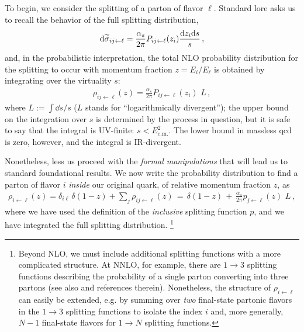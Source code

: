 To begin, we consider the splitting of a parton of flavor \(\ell\).
%
Standard lore asks us to recall the behavior of the full splitting distribution,
\begin{align}
    \dd\overset{\sim}{\sigma}_{ij \leftarrow \ell}
    =
    \frac{\alpha_s}{2\pi}
    P_{ij \leftarrow \ell}(z_i) \frac{\dd z_i \dd s}{s}
    \,,
\end{align}
and, in the probabilistic interpretation, the total NLO probability distribution for the splitting to occur with momentum fraction \(z = E_i/E_\ell\) is obtained by integrating over the virtuality \(s\):
\begin{align}
    \rho_{ij \leftarrow \ell}(z)
    =
    \frac{\alpha_s}{2\pi}
    P_{ij \leftarrow \ell}(z_i)
    \,\,
    L
    \,,
\end{align}
where \(L := \int \dd s / s\) (\(L\) stands for ``logarithmically divergent'');
%
the upper bound on the integration over \(s\) is determined by the process in question, but it is safe to say that the integral is UV-finite:
%
\(s < E_\text{c.m.}^2\).
%
The lower bound in massless \gls{qcd} is zero, however, and the integral is IR-divergent.


Nonetheless, less us proceed with the \emph{formal manipulations} that will lead us to standard foundational results.
%
We now write the probability distribution to find a parton of flavor \(i\) \textit{inside} our original quark, of relative momentum fraction \(z\), as
\begin{align}
    \rho_{i \leftarrow \ell}(z)
    =
    \delta_{i\ell}
    \,
    \delta(1-z) + \sum_j \rho_{ij \leftarrow \ell}(z)
    \,
    =
    \,
    \delta(1-z)
    \,
    +
    \,
    \frac{\alpha_s}{2\pi}
    p_{j\leftarrow \ell}(z)
    \,\,
    L
    \,,
\end{align}
where we have used the definition of the \textit{inclusive} splitting function \(p\), and we have integrated the full splitting distribution.%
\footnote{
    Beyond NLO, we must include additional splitting functions with a more complicated structure.
    At NNLO, for example, there are \(1 \to 3\) splitting functions describing the probability of a single parton converting into three partons \cite{Campbell:1997hg,Catani:1999ss} (see also  and references therein).
    Nonetheless, the structure of \(\rho_{i\leftarrow \ell}\) can easily be extended, e.g. by summing over \emph{two} final-state partonic flavors in the \(1\to 3\) splitting functions to isolate the index \(i\) and, more generally, \(N-1\) final-state flavors for \(1\to N\) splitting functions.
}



